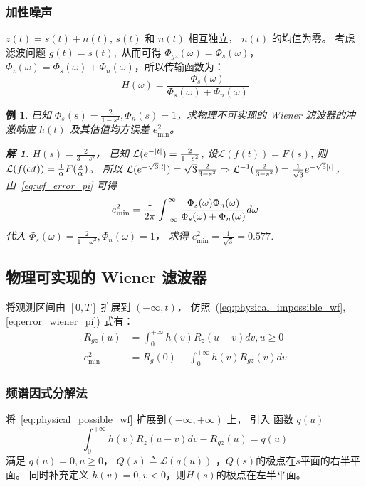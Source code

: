 \documentclass{ctexart}
\numberwithin{equation}{section}
\newtheorem{example}{例}
\newtheorem*{solution}{解}
\DeclarePairedDelimiter\abs{\lvert}{\rvert}
\begin{document}
\subsubsection{加性噪声}
$z(t) = s(t) + n(t)$, $s(t)$ 和 $n(t)$ 相互独立， $n(t)$ 的均值为零。
考虑滤波问题 $g(t) = s(t),$ 从而可得 $\Phi_{gz}(\omega) = \Phi_s(\omega)$， $\Phi_z(\omega) = \Phi_s(\omega) + \Phi_n(\omega)$，所以传输函数为：
$$
H(\omega) = \frac{\Phi_s(\omega)}{\Phi_s(\omega) + \Phi_n(\omega)}
$$
\begin{example}\label{ex:pi}
    已知 $\Phi_s(s) = \frac{2}{1-s^2}, \Phi_n(s) = 1$，求物理不可实现的 Wiener 滤波器的冲激响应 $h(t)$ 及其估值均方误差 $e^2_{\min}$。
    \begin{solution}
        $H(s) = \frac{2}{3 - s^2}$， 已知 $\mathcal{L}(e^{-\abs{t}}) = \frac{2}{1-s^2}$, 设$\mathcal{L}(f(t)) = F(s)$, 则 
        $\mathcal{L}(f(\alpha t)) = {1\over \alpha} F({s \over \alpha})$。 所以 
        $\mathcal{L}(e^{-\sqrt{3}\abs{t}}) = \sqrt{3} \frac{2}{3-s^2} \Rightarrow \mathcal{L}^{-1}(\frac{2}{3-s^2}) = \frac{1}{\sqrt{3}} 
        e^{-\sqrt{3}\abs{t}}$，由~\eqref{eq:wf_error_pi} 可得
        $$
        e^2_{\min} =  {1 \over 2\pi} \int_{-\infty}^{\infty} \frac{\Phi_s(\omega) \Phi_n(\omega)}{\Phi_s(\omega) + \Phi_n(\omega)} d\omega
        $$
        代入 $\Phi_s(\omega) = \frac{2}{1+\omega^2},\Phi_n(\omega) = 1$， 求得 $e^2_{\min} = \frac{1}{\sqrt{3}} = 0.577$.
    \end{solution}
\end{example}
\subsection{物理可实现的 Wiener 滤波器}
将观测区间由 $[0,T]$ 扩展到 $(-\infty, t)$， 仿照~(\ref{eq:physical_impossible_wf},\ref{eq:error_wiener_pi}) 式有：
\begin{align}
   \label{eq:physical_possible_wf} R_{gz}(u) & = \int_0^{+\infty} h(v)R_z(u-v)dv, u\geq 0 \\ 
   \label{eq:error_wiener_p} e^2_{\min} & = R_g(0) - \int_0^{+\infty} h(v) R_{gz}(v) dv
\end{align}
\subsubsection{频谱因式分解法}
将~\eqref{eq:physical_possible_wf} 扩展到$(-\infty,+\infty)$ 上， 引入 函数 $q(u)$
\begin{equation}\label{eq:wf_p_wp}
 \int_0^{+\infty} h(v)R_z(u-v)dv - R_{gz}(u) = q(u)
\end{equation}
满足 $ q(u) = 0, u \geq 0$， $Q(s) \triangleq \mathcal{L}(q(u))$ ，$Q(s)$的极点在$s$平面的右半平面。
同时补充定义 $h(v)=0, v<0$，则$H(s)$的极点在左半平面。
\end{document}

